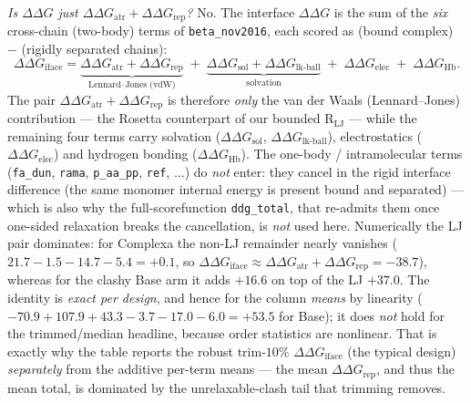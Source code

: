 \documentclass[11pt]{article}
\newcommand{\R}{\mathrm{R}}
\newcommand{\ttk}[1]{\texttt{\small #1}}
\begin{document}
\emph{Is $\Delta\Delta G$ just $\Delta\Delta G_{\mathrm{atr}}+\Delta\Delta G_{\mathrm{rep}}$?} No. The
interface $\Delta\Delta G$ is the sum of the \emph{six} cross-chain (two-body) terms of
\ttk{beta\_nov2016}, each scored as (bound complex) $-$ (rigidly separated chains):
\[
\Delta\Delta G_{\mathrm{iface}}
= \underbrace{\Delta\Delta G_{\mathrm{atr}}+\Delta\Delta G_{\mathrm{rep}}}_{\text{Lennard--Jones (vdW)}}
\;+\; \underbrace{\Delta\Delta G_{\mathrm{sol}}+\Delta\Delta G_{\text{lk-ball}}}_{\text{solvation}}
\;+\; \Delta\Delta G_{\mathrm{elec}}
\;+\; \Delta\Delta G_{\mathrm{Hb}} .
\]
The pair $\Delta\Delta G_{\mathrm{atr}}+\Delta\Delta G_{\mathrm{rep}}$ is therefore \emph{only} the van
der Waals (Lennard--Jones) contribution --- the Rosetta counterpart of our bounded $\R_{\mathrm{LJ}}$
--- while the remaining four terms carry solvation ($\Delta\Delta G_{\mathrm{sol}}$,
$\Delta\Delta G_{\text{lk-ball}}$), electrostatics ($\Delta\Delta G_{\mathrm{elec}}$) and hydrogen
bonding ($\Delta\Delta G_{\mathrm{Hb}}$). The one-body / intramolecular terms (\ttk{fa\_dun},
\ttk{rama}, \ttk{p\_aa\_pp}, \ttk{ref}, $\dots$) do \emph{not} enter: they cancel in the rigid
interface difference (the same monomer internal energy is present bound and separated) --- which is
also why the full-scorefunction \ttk{ddg\_total}, that re-admits them once one-sided relaxation breaks
the cancellation, is \emph{not} used here. Numerically the LJ pair dominates: for Complexa the non-LJ
remainder nearly vanishes ($21.7-1.5-14.7-5.4 = +0.1$, so $\Delta\Delta G_{\mathrm{iface}}\approx
\Delta\Delta G_{\mathrm{atr}}+\Delta\Delta G_{\mathrm{rep}} = -38.7$), whereas for the clashy Base arm
it adds $+16.6$ on top of the LJ $+37.0$. The identity is \emph{exact per design}, and hence for the
column \emph{means} by linearity ($-70.9+107.9+43.3-3.7-17.0-6.0 = +53.5$ for Base); it does
\emph{not} hold for the trimmed/median headline, because order statistics are nonlinear. That is
exactly why the table reports the robust trim-$10\%$ $\Delta\Delta G_{\mathrm{iface}}$ (the typical
design) \emph{separately} from the additive per-term means --- the mean
$\Delta\Delta G_{\mathrm{rep}}$, and thus the mean total, is dominated by the unrelaxable-clash tail
that trimming removes.
\end{document}
